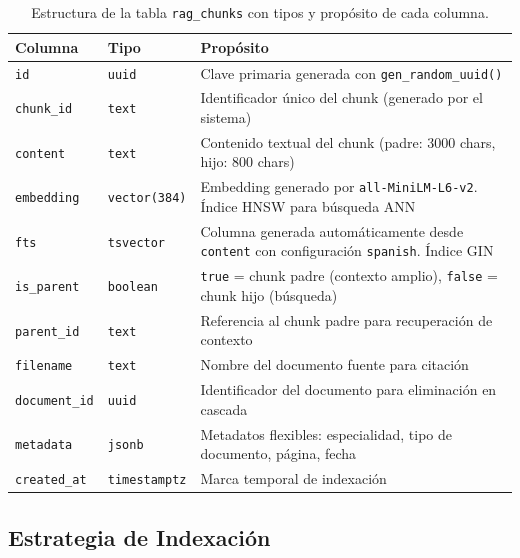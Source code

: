 ﻿\documentclass[11pt,a4paper]{article}
\begin{document}
\begin{table}[H]
\centering
\caption{Estructura de la tabla \texttt{rag\_chunks} con tipos y prop\'osito de cada columna.}
\label{tab:ragchunks}
\begin{tabularx}{\textwidth}{llX}
\toprule
\textbf{Columna} & \textbf{Tipo} & \textbf{Prop\'osito} \\
\midrule
\texttt{id} & \texttt{uuid} & Clave primaria generada con \texttt{gen\_random\_uuid()} \\
\texttt{chunk\_id} & \texttt{text} & Identificador \'unico del chunk (generado por el sistema) \\
\texttt{content} & \texttt{text} & Contenido textual del chunk (padre: 3000 chars, hijo: 800 chars) \\
\texttt{embedding} & \texttt{vector(384)} & Embedding generado por \texttt{all-MiniLM-L6-v2}. \'Indice HNSW para b\'usqueda ANN \\
\texttt{fts} & \texttt{tsvector} & Columna generada autom\'aticamente desde \texttt{content} con configuraci\'on \texttt{spanish}. \'Indice GIN \\
\texttt{is\_parent} & \texttt{boolean} & \texttt{true} = chunk padre (contexto amplio), \texttt{false} = chunk hijo (b\'usqueda) \\
\texttt{parent\_id} & \texttt{text} & Referencia al chunk padre para recuperaci\'on de contexto \\
\texttt{filename} & \texttt{text} & Nombre del documento fuente para citaci\'on \\
\texttt{document\_id} & \texttt{uuid} & Identificador del documento para eliminaci\'on en cascada \\
\texttt{metadata} & \texttt{jsonb} & Metadatos flexibles: especialidad, tipo de documento, p\'agina, fecha \\
\texttt{created\_at} & \texttt{timestamptz} & Marca temporal de indexaci\'on \\
\bottomrule
\end{tabularx}
\end{table}

\subsection{Estrategia de Indexaci\'on}
\end{document}
